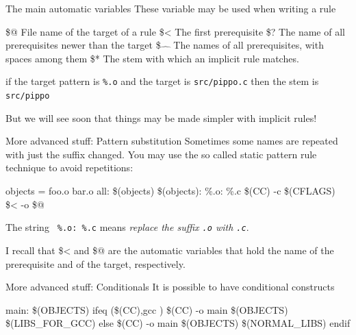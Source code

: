 \documentclass[10pt,aspectratio=169]{beamer}
\begin{document}
\begin{frame}{The main automatic variables}
    These variable may be used when writing a rule
    \begin{semiverbatim}
        \$@  File name of the target of a rule\newline
        \$<   The first prerequisite\newline
        \$?   The name of all prerequisites newer than the target\newline
        \$\!\!$\hat{\quad}$ The names of all prerequisites, with spaces among
        them\newline
        \$*   The stem with which an \alert{implicit rule} matches.
    \end{semiverbatim}
    if the target pattern is  \texttt{\%.o} and the target is \texttt{src/pippo.c} then the stem is \texttt{src/pippo}
    
    \alert{But we will see soon that things may be made simpler with implicit rules!}
    
  \end{frame}

\begin{frame}{More advanced stuff: Pattern substitution}
Sometimes some names are repeated with just the suffix changed. You may
use the so called \alert{static pattern rule} technique to avoid
repetitions:
\begin{semiverbatim}
objects = foo.o bar.o\newline
all: \$(objects)\newline
\$(objects): \%.o: \%.c\newline
\phantom{xx} \$(CC) -c \$(CFLAGS) \$< -o \$@\newline
\end{semiverbatim}
The string \texttt{ \%.o: \%.c} means \emph{replace the suffix \texttt{.o}
with \texttt{.c}}.

I recall that \alert{\$<} and \alert{\$@} are the \alert{automatic variables} that hold the
name of the prerequisite and of the target, respectively.  
\end{frame}


\begin{frame}{More advanced stuff: Conditionals}
	It is possible to have conditional constructs
	\begin{semiverbatim}
		main: \$(OBJECTS) \newline
		ifeq (\$(CC),gcc )\newline
		\phantom{xx} \$(CC) -o main \$(OBJECTS) \$(LIBS\_FOR\_GCC)\newline
		else\newline
		\phantom{xx} \$(CC) -o main \$(OBJECTS) \$(NORMAL\_LIBS)\newline
		endif
	\end{semiverbatim}
\end{frame}
\end{document}
